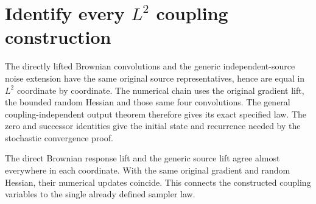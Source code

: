 \documentclass[11pt,a4paper]{article}
\begin{document}
\section{\texorpdfstring{Identify every \(L^{2}\) coupling construction}{Identify every L² coupling construction}}


The directly lifted Brownian convolutions and the generic independent-source noise extension have the same original source representatives, hence are equal in \(L^{2}\) coordinate by coordinate. The numerical chain uses the original gradient lift, the bounded random Hessian and those same four convolutions. The general coupling-independent output theorem therefore gives its exact specified law. The zero and successor identities give the initial state and recurrence needed by the stochastic convergence proof.



The direct Brownian response lift and the generic source lift agree almost everywhere in each coordinate. With the same original gradient and random Hessian, their numerical updates coincide. This connects the constructed coupling variables to the single already defined sampler law.
\end{document}
